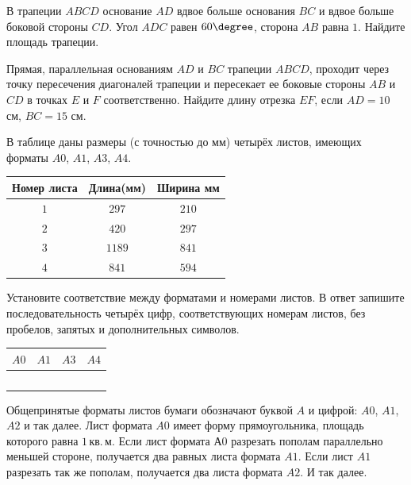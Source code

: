 \begin{class}[number=4]
\begin{listofex}
		\item В трапеции \( ABCD \) основание \( AD \) вдвое больше основания \( BC \) и вдвое больше боковой стороны \( CD \). Угол \( ADC \) равен \( 60\degree \), сторона \( AB \) равна \( 1 \). Найдите площадь трапеции.
		\item Прямая, параллельная основаниям \( AD \) и \( BC \) трапеции \( ABCD \), проходит через точку пересечения диагоналей трапеции и пересекает ее боковые стороны \( AB \) и \( CD \) в точках \( E \) и \( F \) соответственно. Найдите длину отрезка \( EF \), если \( AD=10 \) см, \( BC=15 \) см.
	\end{listofex}
\end{class}

\begin{homework}[number=2]
	\begin{listofex}
		\item В таблице даны размеры (с точностью до мм) четырёх листов, имеющих форматы \( A0 \), \( A1 \), \( A3 \), \( A4 \).
		\begin{center}
			\footnotesize
			\begin{tabular}{|c|c|c|}
				\hline
				\rowcolor{gray}\textbf{Номер листа}&\textbf{Длина(мм)}&\textbf{Ширина мм}\\
				\hline
				\( 1 \)&\( 297 \)&\( 210 \)\\
				\hline
				\( 2 \)&\( 420 \)&\( 297 \)\\
				\hline
				\( 3 \)&\( 1189 \)&\( 841 \)\\
				\hline
				\( 4 \)&\( 841 \)&\( 594 \)\\
				\hline
			\end{tabular}
		\end{center}
		Установите соответствие между форматами и номерами листов. В ответ запишите последовательность четырёх цифр, соответствующих номерам листов, без пробелов, запятых и дополнительных символов.
		\begin{center}
			\footnotesize
			\begin{tabular}{|c|c|c|c|}
				\hline
				\textbf{\( A0 \)}&\textbf{\( A1 \)}&\textbf{\( A3 \)}&\textbf{\( A4 \)}\\
				\hline
				\(  \)&\(  \)&\(  \)&\(  \)\\
				\hline
			\end{tabular}
		\end{center}
		Общепринятые форматы листов бумаги обозначают буквой \( A \) и цифрой: \( A0 \), \( A1 \), \( A2 \) и так далее. Лист формата \( A0 \) имеет форму прямоугольника, площадь которого равна \( 1 \) кв. м. Если лист формата А0 разрезать пополам параллельно меньшей стороне, получается два равных листа формата \( A1 \). Если лист \( A1 \) разрезать так же пополам, получается два листа формата \( A2 \). И так далее.

\end{listofex}
\end{homework}
